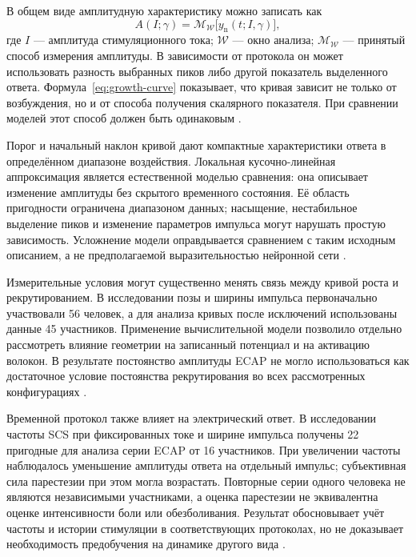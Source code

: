 В общем виде амплитудную характеристику можно записать как
\begin{equation}
 A(I;\gamma)=\mathcal M_{\mathcal W}
 \bigl[y_{\mathrm n}(t;I,\gamma)\bigr],
 \label{eq:growth-curve}
\end{equation}
где $I$ --- амплитуда стимуляционного тока; $\mathcal W$ --- окно анализа; $\mathcal M_{\mathcal W}$ --- принятый способ измерения амплитуды. В зависимости от протокола он может использовать разность выбранных пиков либо другой показатель выделенного ответа. Формула~\eqref{eq:growth-curve} показывает, что кривая зависит не только от возбуждения, но и от способа получения скалярного показателя. При сравнении моделей этот способ должен быть одинаковым \cite{posture,s159}.

Порог и начальный наклон кривой дают компактные характеристики ответа в определённом диапазоне воздействия. Локальная кусочно-линейная аппроксимация является естественной моделью сравнения: она описывает изменение амплитуды без скрытого временного состояния. Её область пригодности ограничена диапазоном данных; насыщение, нестабильное выделение пиков и изменение параметров импульса могут нарушать простую зависимость. Усложнение модели оправдывается сравнением с таким исходным описанием, а не предполагаемой выразительностью нейронной сети \cite{s159,posture}.

Измерительные условия могут существенно менять связь между кривой роста и рекрутированием. В исследовании позы и ширины импульса первоначально участвовали 56 человек, а для анализа кривых после исключений использованы данные 45 участников. Применение вычислительной модели позволило отдельно рассмотреть влияние геометрии на записанный потенциал и на активацию волокон. В результате постоянство амплитуды ECAP не могло использоваться как достаточное условие постоянства рекрутирования во всех рассмотренных конфигурациях \cite{posture}.

Временной протокол также влияет на электрический ответ. В исследовании частоты SCS при фиксированных токе и ширине импульса получены 22 пригодные для анализа серии ECAP от 16 участников. При увеличении частоты наблюдалось уменьшение амплитуды ответа на отдельный импульс; субъективная сила парестезии при этом могла возрастать. Повторные серии одного человека не являются независимыми участниками, а оценка парестезии не эквивалентна оценке интенсивности боли или обезболивания. Результат обосновывает учёт частоты и истории стимуляции в соответствующих протоколах, но не доказывает необходимость предобучения на динамике другого вида \cite{s789}.

